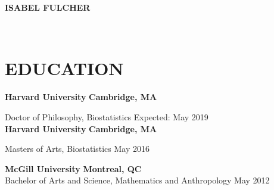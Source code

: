 \documentclass[12pt]{article}
\begin{document}
\newcommand{\MYhref}[3][blue]{\href{#2}{\color{#1}{#3}}}%
\begin{center}
	\textbf{
			{\huge I}{\Large SABEL} \hspace{-0.1em} 
			{\huge F}{\Large ULCHER}}\\
\end{center}
\begin{minipage}[t]{0.5\linewidth}
\begin{flushleft}
     \MYhref[black]{mailto:isabelfulcher@g.harvard.edu}{isabelfulcher@g.harvard.edu} \\
    \MYhref[black]{http://orcid.org/0000-0002-1209-824X}{ORCID: 0000-0002-1209-824X} 
         \end{flushleft}
\end{minipage}
\begin{minipage}[t]{0.5\linewidth} 
\end{minipage}


\section*{\textbf{{\large E}DUCATION}}

\textbf{Harvard University} \hfill \hfill \textbf{Cambridge, MA}

Doctor of Philosophy, Biostatistics \hfill \hfill Expected: May 2019 \\

\textbf{Harvard University} \hfill \hfill \textbf{Cambridge, MA}

Masters of Arts, Biostatistics \hfill \hfill May 2016

\vspace{.5cm}

\textbf{McGill University} \hfill \hfill \textbf{Montreal, QC} \\
Bachelor of Arts and Science, Mathematics and Anthropology \hfill \hfill May 2012 
\end{document}
